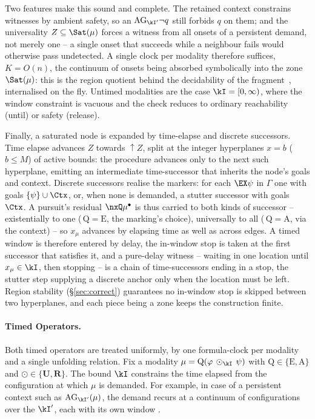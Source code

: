 Two features make this sound and complete. The retained context constrains witnesses by ambient safety, so an
$\mathrm{AG}_{\kI'}\neg q$ still forbids $q$ on them; and the universality $Z\subseteq\Sat(\mu)$ forces a
witness from {all} onsets of a persistent demand, not merely one -- a single onset that succeeds while a
neighbour fails would otherwise pass undetected. A single clock per modality therefore suffices, $K=O(n)$, the
continuum of onsets being absorbed symbolically into the zone $\Sat(\mu)$: this is the region quotient behind
the decidability of the fragment~\cite{fsttcs2000-LN,LaTorreNapoli2001TimedTreeAutomata}, internalised on the
fly. Untimed modalities are the case $\kI=[0,\infty)$, where the window constraint is vacuous and the check
reduces to ordinary reachability (until) or safety (release).

Finally, a saturated node is expanded by time-elapse and discrete successors. Time elapse advances $Z$ towards
$\uparrow Z$, {split at the integer hyperplanes} $x=b$ ($b\le M$) of active bounds: the procedure
advances only to the next such hyperplane, emitting an intermediate {time-successor} that inherits the
node's goals and context. Discrete successors realise the markers: for each $\EX\psi$ in $\Gamma$ one with
goals $\{\psi\}\cup\Ctx$, or, when none is demanded, a stutter successor with goals $\Ctx$. A pursuit's
residual $\nxQ\mu^\bullet$ is thus carried to {both} kinds of successor -- existentially to one
(\,$\mathrm{Q}=\mathrm{E}$, the marking's choice), universally to all (\,$\mathrm{Q}=\mathrm{A}$, via the
context) -- so $x_\mu$ advances by elapsing time as well as across edges. A timed window is therefore entered
by delay, the in-window stop is taken at the first successor that satisfies it, and a pure-delay witness --
waiting in one location until $x_\mu\in\kI$, then stopping -- is a chain of time-successors ending in a stop,
the stutter step supplying a discrete anchor only when the location must be left. Region stability
(\S\ref{sec:correct}) guarantees no in-window stop is skipped between two hyperplanes, and each piece being a
zone keeps the construction finite.





\paragraph{Timed Operators.}

Both timed operators are treated uniformly, by one formula-clock per modality and a single unfolding relation. Fix a modality $\mu=\mathrm{Q}(\varphi\,\odot_\kI\,\psi)$ with $\mathrm{Q}\in\{\mathrm{E},\mathrm{A}\}$ and $\odot\in\{\mathbf{U},\mathbf{R}\}$. The bound $\kI$ constrains the time elapsed from the configuration at which $\mu$ is demanded. For example, in case of a persistent context such as $\mathrm{AG}_{\kI '}(\mu)$, the demand recurs at a continuum of configurations over the $\kI'$, each with its own window \kI. 

